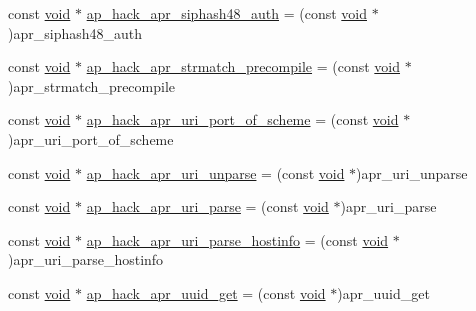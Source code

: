 \begin{DoxyCompactItemize}
\item 
const \hyperlink{group__MOD__ISAPI_gacd6cdbf73df3d9eed42fa493d9b621a6}{void} $\ast$ \hyperlink{srclib_2apr-util_2exports_8c_af53b42df5c6beac06b481c702314ac9c}{ap\+\_\+hack\+\_\+apr\+\_\+siphash48\+\_\+auth} = (const \hyperlink{group__MOD__ISAPI_gacd6cdbf73df3d9eed42fa493d9b621a6}{void} $\ast$)apr\+\_\+siphash48\+\_\+auth
\item 
const \hyperlink{group__MOD__ISAPI_gacd6cdbf73df3d9eed42fa493d9b621a6}{void} $\ast$ \hyperlink{srclib_2apr-util_2exports_8c_a5b1db0eac77201cb00ac8402cfcde5a8}{ap\+\_\+hack\+\_\+apr\+\_\+strmatch\+\_\+precompile} = (const \hyperlink{group__MOD__ISAPI_gacd6cdbf73df3d9eed42fa493d9b621a6}{void} $\ast$)apr\+\_\+strmatch\+\_\+precompile
\item 
const \hyperlink{group__MOD__ISAPI_gacd6cdbf73df3d9eed42fa493d9b621a6}{void} $\ast$ \hyperlink{srclib_2apr-util_2exports_8c_a218f1c3a3755414fdbc04a3c1061b8c2}{ap\+\_\+hack\+\_\+apr\+\_\+uri\+\_\+port\+\_\+of\+\_\+scheme} = (const \hyperlink{group__MOD__ISAPI_gacd6cdbf73df3d9eed42fa493d9b621a6}{void} $\ast$)apr\+\_\+uri\+\_\+port\+\_\+of\+\_\+scheme
\item 
const \hyperlink{group__MOD__ISAPI_gacd6cdbf73df3d9eed42fa493d9b621a6}{void} $\ast$ \hyperlink{srclib_2apr-util_2exports_8c_a10154874a02c72f43685a577462ce087}{ap\+\_\+hack\+\_\+apr\+\_\+uri\+\_\+unparse} = (const \hyperlink{group__MOD__ISAPI_gacd6cdbf73df3d9eed42fa493d9b621a6}{void} $\ast$)apr\+\_\+uri\+\_\+unparse
\item 
const \hyperlink{group__MOD__ISAPI_gacd6cdbf73df3d9eed42fa493d9b621a6}{void} $\ast$ \hyperlink{srclib_2apr-util_2exports_8c_a16a60bd877939efd933d6ffdee69ac3e}{ap\+\_\+hack\+\_\+apr\+\_\+uri\+\_\+parse} = (const \hyperlink{group__MOD__ISAPI_gacd6cdbf73df3d9eed42fa493d9b621a6}{void} $\ast$)apr\+\_\+uri\+\_\+parse
\item 
const \hyperlink{group__MOD__ISAPI_gacd6cdbf73df3d9eed42fa493d9b621a6}{void} $\ast$ \hyperlink{srclib_2apr-util_2exports_8c_a327edda4ca247e3885d096d62e1878df}{ap\+\_\+hack\+\_\+apr\+\_\+uri\+\_\+parse\+\_\+hostinfo} = (const \hyperlink{group__MOD__ISAPI_gacd6cdbf73df3d9eed42fa493d9b621a6}{void} $\ast$)apr\+\_\+uri\+\_\+parse\+\_\+hostinfo
\item 
const \hyperlink{group__MOD__ISAPI_gacd6cdbf73df3d9eed42fa493d9b621a6}{void} $\ast$ \hyperlink{srclib_2apr-util_2exports_8c_a01029847c78c85041852620d3bc4e5c6}{ap\+\_\+hack\+\_\+apr\+\_\+uuid\+\_\+get} = (const \hyperlink{group__MOD__ISAPI_gacd6cdbf73df3d9eed42fa493d9b621a6}{void} $\ast$)apr\+\_\+uuid\+\_\+get

\end{DoxyCompactItemize}
